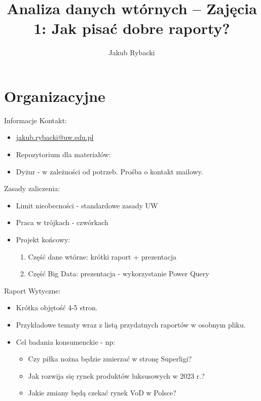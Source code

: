 \documentclass{beamer}
\title{Analiza danych wtórnych – \newline
 Zajęcia 1: Jak pisać dobre raporty?}
\author{Jakub Rybacki}
\begin{document}
\begin{frame}[plain]
    \maketitle
\end{frame}

\section{Organizacyjne}
\begin{frame}{Informacje}
	Kontakt:
	\begin{itemize}
		\item \href{mailto:jakub.rybacki@uw.edu.pl}{jakub.rybacki@uw.edu.pl}
		\item Repozytorium dla materiałów: \href{https://github.com/jakubrybacki/PsychUW_Data}{} 
		\item Dyżur - w zależności od potrzeb. Prośba o kontakt mailowy. 
	\end{itemize}
	\vspace{2mm}	
	Zasady zaliczenia:
	\begin{itemize}
	\item Limit nieobecności - standardowe zasady UW
	\item Praca w trójkach - czwórkach 
	\item Projekt końcowy:
		\begin{enumerate}
			\item Część dane wtórne: krótki raport + prezentacja
			\item Część Big Data: prezentacja - wykorzystanie Power Query
		\end{enumerate}
	\end{itemize}
\end{frame}

\begin{frame}{Raport}
	Wytyczne:
	\begin{itemize}
		\item Krótka objętość 4-5 stron.  
		\item Przykładowe tematy wraz z listą przydatnych raportów w osobnym pliku. 
		\item Cel badania konsumenckie - np: 
		\begin{itemize}
			\item Czy piłka nożna będzie zmierzać w stronę Superligi? 
			\item Jak rozwija się rynek produktów luksusowych w 2023 r.?
			\item Jakie zmiany będą czekać rynek VoD w Polsce?
		\end{itemize}		
	\end{itemize}
\end{frame}
\end{document}
